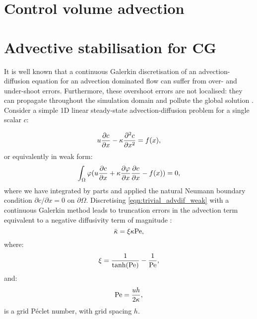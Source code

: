 \section{Control volume advection}
\label{ControlVolumeAdvection}


\section{Advective stabilisation for CG}
\label{Sect:ND_advective_stabilisation_CG}

It is well known that a continuous Galerkin discretisation of an
advection-diffusion equation for an advection dominated flow can suffer from
over- and under-shoot errors. Furthermore, these overshoot errors are not
localised: they can propagate throughout the simulation domain and pollute the
global solution \citep{hughes1987}. Consider a simple 1D linear steady-state
advection-diffusion problem for a single scalar $c$:

\begin{equation}\label{eqn:trivial_advdif}
  u \frac{\partial c}{\partial x} - \kappa \frac{\partial^2c}{\partial x^2} = f(x),
\end{equation}
or equivalently in weak form:
\begin{equation}\label{eqn:trivial_advdif_weak}
  \int_\Omega \varphi (u \frac{\partial c}{\partial x} + \kappa \frac{\partial\varphi}{\partial x} \frac{\partial c}{\partial x} - f(x)) = 0,
\end{equation}
where we have integrated by parts and applied the natural Neumann boundary
condition $\partial c / \partial x = 0$ on $\partial \Omega$.
Discretising \eqref{eqn:trivial_advdif_weak} with a continuous Galerkin method
leads to truncation errors in the advection term equivalent to a negative
diffusivity term of magnitude \citep{DoneaBook}:
\begin{equation}\label{eqn:cg_implicit_diffusivity}
  \bar{\kappa} = \xi \kappa \mathrm{Pe},
\end{equation}
where:
\begin{equation}\label{eqn:xi_parameter}
  \xi = \frac{1}{\tanh(\mathrm{Pe})} - \frac{1}{\mathrm{Pe}},
\end{equation}
and:
\begin{equation}\label{eqn:grid_pe}
  \mathrm{Pe} = \frac{u h}{2 \kappa},
\end{equation}
is a grid P\'eclet number, with grid spacing $h$.

